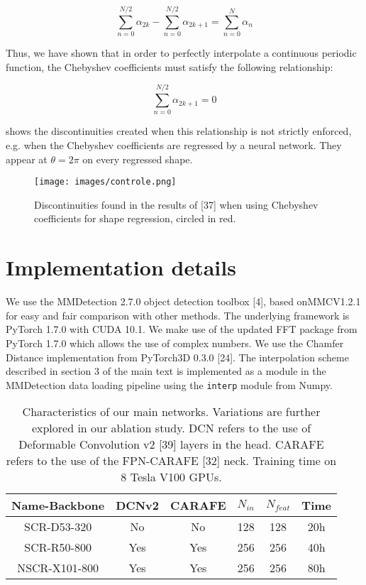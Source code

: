\documentclass[10pt,twocolumn]{article}
\begin{document}
\begin{equation}
    \sum_{n=0}^{N/2} \alpha_{2k} - \sum_{n=0}^{N/2} \alpha_{2k+1} = \sum_{n=0}^{N} \alpha_{n} 
\end{equation}

Thus, we have shown that in order to perfectly interpolate
a continuous periodic function, the Chebyshev coefficients
must satisfy the following relationship:

\begin{equation}
    \sum_{n=0}^{N/2} \alpha_{2k+1} = 0
\end{equation}

 shows the discontinuities created when this relationship
is not strictly enforced, e.g. when the Chebyshev
coefficients are regressed by a neural network. They appear
at $\theta = 2 \pi$ on every regressed shape.

\begin{figure}[H]
    \centering
    \texttt{[image: images/controle.png]}
    \caption{Discontinuities found in the results of [37] when using
Chebyshev coefficients for shape regression, circled in red.}
    \label{fig:fig7}
\end{figure}


\section{Implementation details}

We use the MMDetection 2.7.0 object detection toolbox
[4], based onMMCV1.2.1 for easy and fair comparison
with other methods. The underlying framework is PyTorch
1.7.0 with CUDA 10.1. We make use of the updated FFT
package from PyTorch 1.7.0 which allows the use of complex
numbers. We use the Chamfer Distance implementation
from PyTorch3D 0.3.0 [24]. The interpolation scheme
described in section 3 of the main text is implemented as a
module in the MMDetection data loading pipeline using the
\texttt{interp} module from Numpy.

\begin{table}[H]
    \centering
    \begin{tabular}{c|c|c|c|c|c}
         Name-Backbone & DCNv2 & CARAFE & $N_{in}$  & $N_{feat}$ & Time \\
         \hline
         SCR-D53-320 & No & No & 128 & 128 & 20h \\
         SCR-R50-800 & Yes & Yes & 256 & 256 & 40h \\
         NSCR-X101-800 &  Yes &  Yes &  256 &  256 & 80h \\
    \end{tabular}
    \caption{Characteristics of our main networks. Variations are further
explored in our ablation study. DCN refers to the use of Deformable
Convolution v2 [39] layers in the head. CARAFE refers
to the use of the FPN-CARAFE [32] neck. Training time on 8
Tesla V100 GPUs.}
    \label{tab:tabl}
\end{table}
\end{document}
